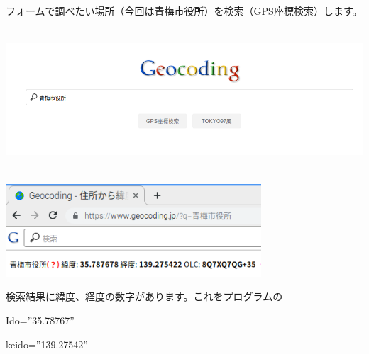 \documentclass[a4paper,12pt,dvipdfmx]{jarticle}
\begin{document}
\bigskip


\bigskip

フォームで調べたい場所（今回は青梅市役所）を検索（GPS座標検索）します。



\begin{center}
\includegraphics[width=17.006cm,height=5.329cm]{textbook-img053.png}

\end{center}

\bigskip


\bigskip



\begin{center}
\includegraphics[width=9.525cm,height=3.471cm]{textbook-img054.png}

\end{center}

\bigskip


\bigskip


\bigskip


\bigskip

検索結果に緯度、経度の数字があります。これをプログラムの



\begin{center}
\begin{boxedminipage}{7.959cm}
Ido=”35.78767”

keido=”139.27542”
\end{boxedminipage}
\end{center}
\end{document}
